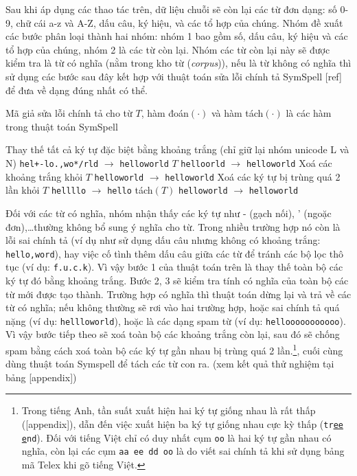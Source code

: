Sau khi áp dụng các thao tác trên, dữ liệu chuỗi sẽ còn lại các từ đơn dạng: số 0-9, chữ cái a-z và A-Z, dấu câu, ký hiệu, và các tổ hợp của chúng. Nhóm đề xuất các bước phân loại thành hai nhóm: nhóm 1 bao gồm số, dấu câu, ký hiệu và các tổ hợp của chúng, nhóm 2 là các từ còn lại. Nhóm các từ còn lại này sẽ được kiểm tra là từ có nghĩa (nằm trong kho từ (\textit{corpus})), nếu là từ không có nghĩa thì sử dụng các bước sau đây kết hợp với thuật toán sửa lỗi chính tả SymSpell [ref] để đưa về dạng đúng nhất có thể.

\begin{algorithmz}[htb]
    \caption{Mã giả sửa lỗi chính tả cho từ $T$, hàm đoán$(\cdot)$ và hàm tách$(\cdot)$ là các hàm trong thuật toán SymSpell}
    \begin{algorithmic}[1]
        \State Thay thế tất cả ký tự đặc biệt bằng khoảng trắng (chỉ giữ lại nhóm unicode L và N)
        \Comment \texttt{hel+-lo.,wo*/rld} $\to$ \texttt{hel\textvisiblespace lo\textvisiblespace wo\textvisiblespace rld}
        \Return $T$
        \EndIf
        \Comment \texttt{hello\textvisiblespace orld} $\to$ \texttt{hello\textvisiblespace world}
        \State Xoá các khoảng trắng khỏi $T$
        \Comment \texttt{hello\textvisiblespace world} $\to$ \texttt{helloworld}
        \State Xoá các ký tự bị trùng quá 2 lần khỏi $T$
        \Comment \texttt{hellllo} $\to$ \texttt{hello}
        \State \Return tách$(T)$
        \Comment \texttt{helloworld} $\to$ \texttt{hello\textvisiblespace world}
    \end{algorithmic}
\end{algorithmz}

Đối với các từ có nghĩa, nhóm nhận thấy các ký tự như - (gạch nối), ' (ngoặc đơn),\dots thường không bổ sung ý nghĩa cho từ. Trong nhiều trường hợp nó còn là lỗi sai chính tả (ví dụ như sử dụng dấu câu nhưng không có khoảng trắng: \texttt{hello,word}), hay việc cố tình thêm dấu câu giữa các từ để tránh các bộ lọc thô tục (ví dụ: \texttt{f.u.c.k}). Vì vậy bước 1 của thuật toán trên là thay thế toàn bộ các ký tự đó bằng khoảng trắng. Bước 2, 3 sẽ kiểm tra tính có nghĩa của toàn bộ các từ mới được tạo thành. Trường hợp có nghĩa thì thuật toán dừng lại và trả về các từ có nghĩa; nếu không thường sẽ rơi vào hai trường hợp, hoặc sai chính tả quá nặng (ví dụ: \texttt{hel\textvisiblespace llowo\textvisiblespace rld}), hoặc là các dạng spam từ (ví dụ: \texttt{hellooooooooooo}). Vì vậy bước tiếp theo sẽ xoá toàn bộ các khoảng trắng còn lại, sau đó sẽ chống spam bằng cách xoá toàn bộ các ký tự gần nhau bị trùng quá 2 lần.\footnote{Trong tiếng Anh, tần suất xuất hiện hai ký tự giống nhau là rất thấp ([appendix]), dẫn đến việc xuất hiện ba ký tự giống nhau cực kỳ thấp (\texttt{tr\underline{ee} \underline{e}nd}). Đối với tiếng Việt chỉ có duy nhất cụm \texttt{oo} là hai ký tự gần nhau có nghĩa, còn lại các cụm \texttt{aa ee dd oo} là do viết sai chính tả khi sử dụng bảng mã Telex khi gõ tiếng Việt.}, cuối cùng dùng thuật toán Symspell để tách các từ con ra. (xem kết quả thử nghiệm tại bảng [appendix])

